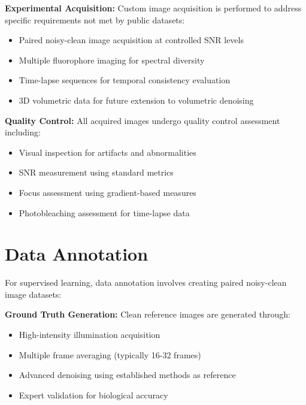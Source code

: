 \documentclass[12pt,a4paper]{report}
\begin{document}
\vspace{0.5cm}

\textbf{Experimental Acquisition:} Custom image acquisition is performed to address specific requirements not met by public datasets:
\begin{itemize}
    \item Paired noisy-clean image acquisition at controlled SNR levels
    \item Multiple fluorophore imaging for spectral diversity
    \item Time-lapse sequences for temporal consistency evaluation
    \item 3D volumetric data for future extension to volumetric denoising
\end{itemize}

\vspace{0.5cm}

\textbf{Quality Control:} All acquired images undergo quality control assessment including:
\begin{itemize}
    \item Visual inspection for artifacts and abnormalities
    \item SNR measurement using standard metrics
    \item Focus assessment using gradient-based measures
    \item Photobleaching assessment for time-lapse data
\end{itemize}

\section{Data Annotation}

For supervised learning, data annotation involves creating paired noisy-clean image datasets:

\vspace{0.5cm}

\textbf{Ground Truth Generation:} Clean reference images are generated through:
\begin{itemize}
    \item High-intensity illumination acquisition
    \item Multiple frame averaging (typically 16-32 frames)
    \item Advanced denoising using established methods as reference
    \item Expert validation for biological accuracy
\end{itemize}
\end{document}
